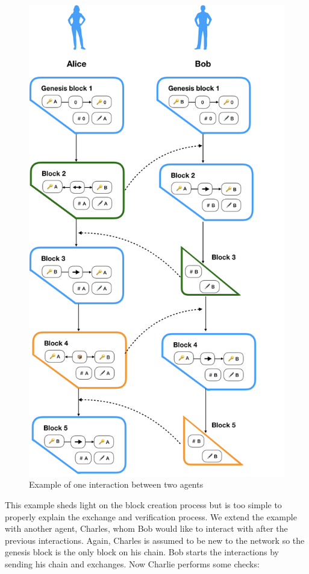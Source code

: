 \begin{figure}
    \centering
    \includegraphics[height=0.9\textheight]{images/exchange_example}
    \caption{Example of one interaction between two agents}
    \label{fig:exchange_example}
\end{figure}

This example sheds light on the block creation process but is too simple to properly explain the 
exchange and verification process. We extend the example with another agent, Charles, whom Bob would
like to interact with after the previous interactions. Again, Charles is assumed to be new to the 
network so the genesis block is the only block on his chain. Bob starts the interactions by sending
his chain and exchanges. Now Charlie performs some checks: 

